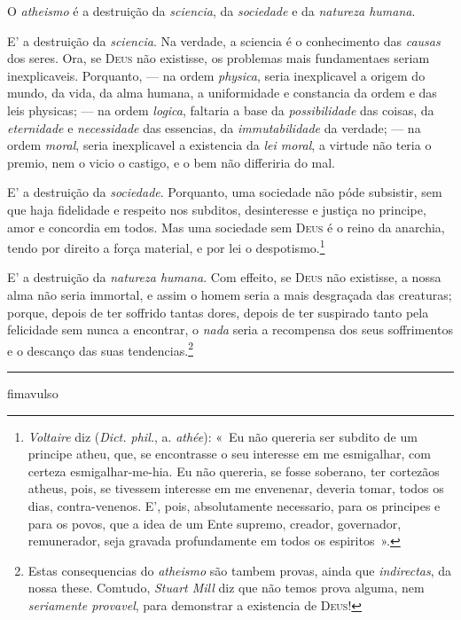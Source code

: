 O \emph{atheismo} é a destruição da \emph{sciencia}, da \emph{sociedade} e da
\emph{natureza humana}.

 E' a destruição da \emph{sciencia}. Na verdade, a sciencia é o conhecimento das
\emph{causas} dos seres. Ora, se \textsc{Deus} não existisse, os problemas mais
fundamentaes seriam inexplicaveis. Porquanto, --- na ordem \emph{physica}, seria
inexplicavel a origem do mundo, da vida, da alma humana, a uniformidade e constancia da
ordem e das leis physicas; --- na ordem \emph{logica}, faltaria a base da
\emph{possibilidade} das coisas, da \emph{eternidade} e \emph{necessidade} das
essencias, da \emph{immutabilidade} da verdade; --- na ordem \emph{moral}, seria
inexplicavel a existencia da \emph{lei moral}, a virtude não teria o premio, nem o vicio
o castigo, e o bem não differiria do mal.

 E' a destruição da \emph{sociedade}. Porquanto, uma sociedade não póde
subsistir, sem que haja fidelidade e respeito nos subditos, desinteresse e justiça no
principe, amor e concordia em todos. Mas uma sociedade sem \textsc{Deus} é o reino da
anarchia, tendo por direito a força material, e por lei o despotismo.\footnote{%
\emph{Voltaire} diz (\emph{Dict. phil.}, a. \emph{athée}): «~Eu não quereria ser subdito
de um principe atheu, que, se encontrasse o seu interesse em me esmigalhar, com certeza
esmigalhar-me-hia. Eu não quereria, se fosse soberano, ter cortezãos atheus, pois, se
tivessem interesse em me envenenar, deveria tomar, todos os dias, contra-venenos. E',
pois, absolutamente necessario, para os principes e para os povos, que a idea de um Ente
supremo, creador, governador, remunerador, seja gravada profundamente em todos os
espiritos~».}

 E' a destruição da \emph{natureza humana}. Com effeito, se \textsc{Deus} não
existisse, a nossa alma não seria immortal, e assim o homem seria a mais desgraçada das
creaturas; porque, depois de ter soffrido tantas dores, depois de ter suspirado tanto
pela felicidade sem nunca a encontrar, o \emph{nada} seria a recompensa dos seus
soffrimentos e o descanço das suas tendencias.\footnote{Estas consequencias do
\emph{atheismo} são tambem provas, ainda que \emph{indirectas}, da nossa these. Comtudo,
\emph{Stuart Mill} diz que não temos prova alguma, nem \emph{seriamente provavel}, para
demonstrar a existencia de \textsc{Deus}!}

\begin{center}\rule{3em}{0.4pt}\end{center}

\csname fimavulso\endcsname
